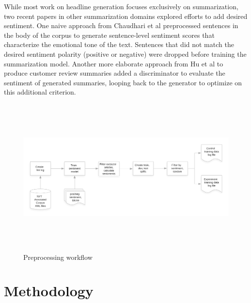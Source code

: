 \documentclass[11pt]{article}
\begin{document}
While most work on headline generation focuses exclusively on summarization, two recent papers in other summarization domains explored efforts to add desired sentiment. One naive approach from Chaudhari et al \cite{DBLP:journals/corr/abs-1802-09426} preprocessed sentences in the body of the corpus to generate sentence-level sentiment scores that characterize the emotional tone of the text. Sentences that did not match the desired sentiment polarity (positive or negative) were dropped before training the summarization model. Another more elaborate approach from Hu et al \cite{DBLP:journals/corr/HuYLSX17} to produce customer review summaries added a discriminator to evaluate the sentiment of generated summaries, looping back to the generator to optimize on this additional criterion. 


\begin{figure}
  \centering
  \includegraphics[width=\textwidth,height=8cm]{HeadGen_pre_p.png}
  \caption{Preprocessing workflow}
\end{figure}

\section{Methodology}
\end{document}

